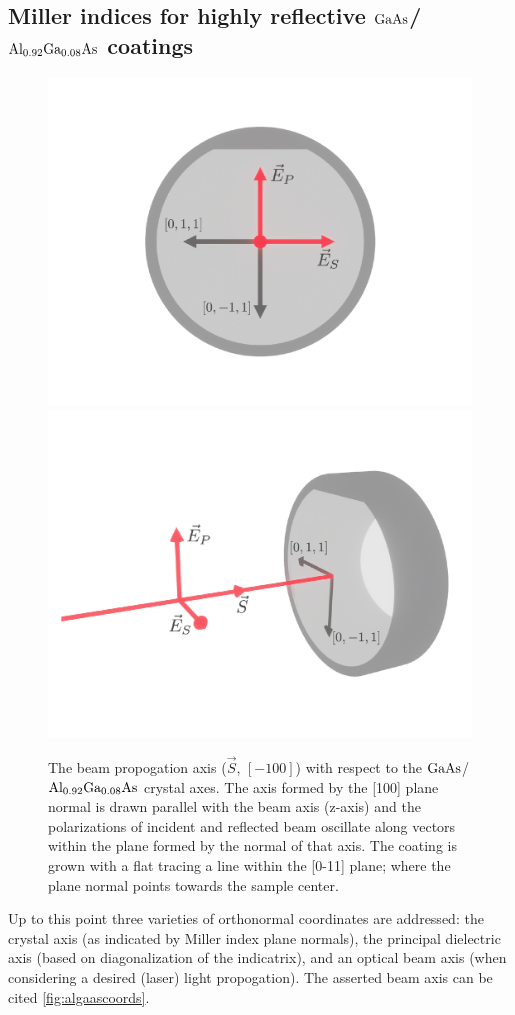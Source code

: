 \subsection{Miller indices for highly reflective $\mathrm{GaAs}$/$\mathrm{Al_{0.92}Ga_{0.08}As}$ coatings}
\begin{figure}[!hb]
    \begin{subcaptiongroup}
	    \includegraphics[width=.5\textwidth]{figs/ALGAAS/coating_orientation_normal.pdf}
	    \label{conormal}
	    \includegraphics[width=.5\textwidth]{figs/ALGAAS/coating_orientation_isometric.pdf}
	    \label{coiso}
    \end{subcaptiongroup}
\caption{The beam propogation axis ($\vec{S}$, $[-100]$) with respect to the $\mathrm{GaAs}$/$\mathrm{Al_{0.92}Ga_{0.08}As}$ crystal axes. The axis formed by the [100] plane normal is drawn parallel with the beam axis (z-axis) and the polarizations of incident and reflected beam oscillate along vectors within the plane formed by the normal of that axis. The coating is grown with a flat tracing a line within the [0-11] plane; where the plane normal points towards the sample center.}
\label{fig:algaascoords}
\end{figure}

Up to this point three varieties of orthonormal coordinates are addressed: the crystal axis (as indicated by Miller index plane normals), the principal dielectric axis (based on diagonalization of the indicatrix), and an optical beam axis (when considering a desired (laser) light propogation). The asserted beam axis can be cited \autoref{fig:algaascoords}.

